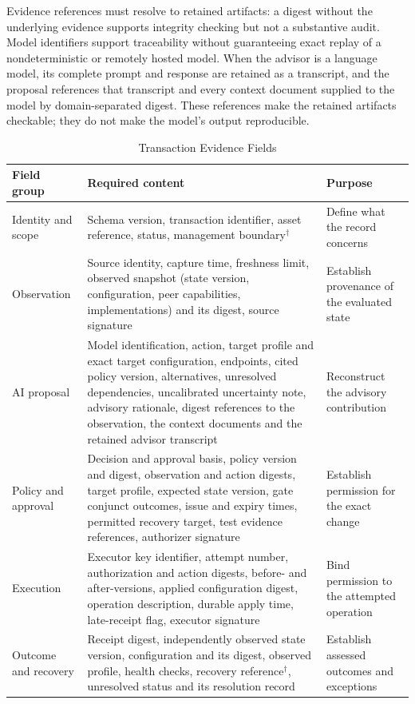 \documentclass[journal]{IEEEtran}
\begin{document}
Evidence references must resolve to retained artifacts: a digest without the underlying evidence supports integrity checking but not a substantive audit. Model identifiers support traceability without guaranteeing exact replay of a nondeterministic or remotely hosted model. When the advisor is a language model, its complete prompt and response are retained as a transcript, and the proposal references that transcript and every context document supplied to the model by domain-separated digest. These references make the retained artifacts checkable; they do not make the model's output reproducible.

\begin{table}[!t]
\caption{Transaction Evidence Fields}
\label{tab:fields}
\centering
\footnotesize
\begin{tabular}{>{\raggedright\arraybackslash}p{3.0cm}>{\raggedright\arraybackslash}p{8.4cm}>{\raggedright\arraybackslash}p{4.2cm}}
\toprule
Field group & Required content & Purpose \\
\midrule
Identity and scope & Schema version, transaction identifier, asset reference, status, management boundary$^{\dagger}$ & Define what the record concerns \\
Observation & Source identity, capture time, freshness limit, observed snapshot (state version, configuration, peer capabilities, implementations) and its digest, source signature & Establish provenance of the evaluated state \\
AI proposal & Model identification, action, target profile and exact target configuration, endpoints, cited policy version, alternatives, unresolved dependencies, uncalibrated uncertainty note, advisory rationale, digest references to the observation, the context documents and the retained advisor transcript & Reconstruct the advisory contribution \\
Policy and approval & Decision and approval basis, policy version and digest, observation and action digests, target profile, expected state version, gate conjunct outcomes, issue and expiry times, permitted recovery target, test evidence references, authorizer signature & Establish permission for the exact change \\
Execution & Executor key identifier, attempt number, authorization and action digests, before- and after-versions, applied configuration digest, operation description, durable apply time, late-receipt flag, executor signature & Bind permission to the attempted operation \\
Outcome and recovery & Receipt digest, independently observed state version, configuration and its digest, observed profile, health checks, recovery reference$^{\dagger}$, unresolved status and its resolution record & Establish assessed outcomes and exceptions \\

\end{tabular}
\end{table}
\end{document}

